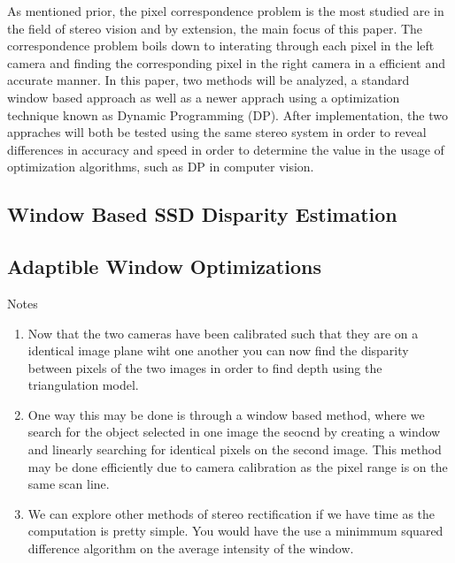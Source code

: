 \documentclass[11pt]{scrartcl}
\begin{document}
As mentioned prior, the pixel correspondence problem is the most studied are in the 
field of stereo vision and by extension, the main focus of this paper. The correspondence 
problem boils down to interating through each pixel in the left camera and finding the 
corresponding pixel in the right camera in a efficient and accurate manner. In this paper, 
two methods will be analyzed, a standard window based approach as well as a newer apprach 
using a optimization technique known as Dynamic Programming (DP). After implementation, the 
two appraches will both be tested using the same stereo system in order to reveal differences 
in accuracy and speed in order to determine the value in the usage of optimization algorithms, 
such as DP in computer vision. 

\subsection{Window Based SSD Disparity Estimation}

\subsection{Adaptible Window Optimizations}
\begin{remark}
  Notes{\begin{enumerate}
        \item Now that the two cameras have been calibrated such that they are on a identical image plane wiht one another you can now find the disparity between pixels of the two images in order to find depth using the triangulation model.
        \item One way this may be done is through a window based method, where we search for the object selected in one image the seocnd by creating a window and linearly searching for identical pixels on the second image. This method may be done efficiently due to camera calibration as the pixel range is on the same scan line.
        \item We can explore other methods of stereo rectification if we have time as the computation is pretty simple. You would have the use
              a minimmum squared difference algorithm on the average intensity of the window.
      \end{enumerate}} %
  \label{par:Notes}


\end{remark}
\end{document}
